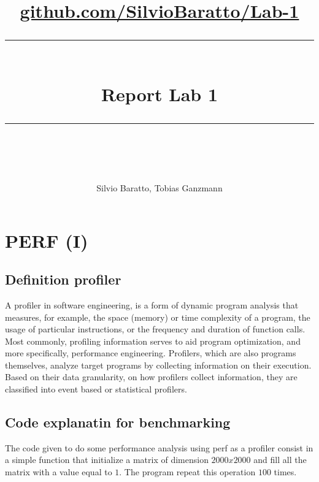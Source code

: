 \documentclass[11pt,a4paper]{article}
\begin{document}
\newcommand{\horrule}[1]{\rule{\linewidth}{#1}}
\lstset{language=Java} 
\lstset{basicstyle=\footnotesize\ttfamily}
\author{Silvio Baratto, Tobias Ganzmann}
\title{
\normalfont \normalsize 
\href{https://github.com/SilvioBaratto/Numerical-and-Data-Intensive-Computing}{github.com/SilvioBaratto/Lab-1} \\ [25pt] %
\horrule{0.5pt} \\[0.4cm] %
\huge Report Lab 1\\ %
\horrule{2pt} \\[0.5cm] %
}
\maketitle
\tableofcontents
\newpage
\section{PERF (I)}
\subsection{Definition profiler}
A profiler in software engineering, is a form of dynamic program analysis that measures, for example, the space (memory) or time complexity of a program, the usage of particular instructions, or the frequency and duration of function calls. Most commonly, profiling information serves to aid program optimization, and more specifically, performance engineering. Profilers, which are also programs themselves, analyze target programs by collecting information on their execution. Based on their data granularity, on how profilers collect information, they are classified into event based or statistical profilers.\\
\subsection{Code explanatin for benchmarking}
The code given to do some performance analysis using perf as a profiler consist in a simple function that initialize a matrix of dimension $2000 x 2000$ and fill all the matrix with a value equal to $1$. The program repeat this operation $100$ times. 
\end{document}
